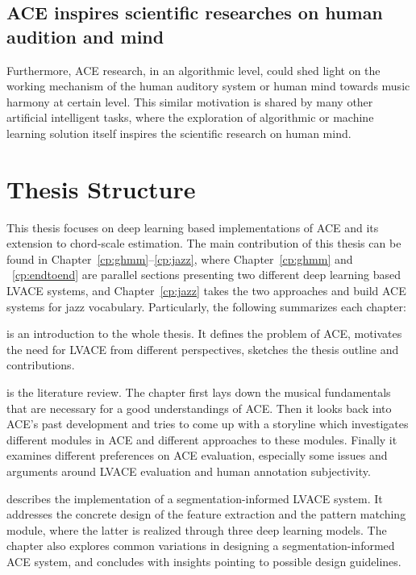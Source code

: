 \subsection{ACE inspires scientific researches on human audition and mind}
Furthermore, ACE research, in an algorithmic level, could shed light on the working mechanism of the human auditory system or human mind towards music harmony at certain level. This similar motivation is shared by many other artificial intelligent tasks\cite{lecun1995convolutional,hinton1995wake}, where the exploration of algorithmic or machine learning solution itself inspires the scientific research on human mind.

\section{Thesis Structure} \label{sec:1-outline}
This thesis focuses on deep learning based implementations of ACE and its extension to chord-scale estimation. The main contribution of this thesis can be found in Chapter~\ref{cp:ghmm}--\ref{cp:jazz}, where Chapter~\ref{cp:ghmm} and ~\ref{cp:endtoend} are parallel sections presenting two different deep learning based LVACE systems, and Chapter~\ref{cp:jazz} takes the two approaches and build ACE systems for jazz vocabulary. Particularly, the following summarizes each chapter:

 is an introduction to the whole thesis. It defines the problem of ACE, motivates the need for LVACE from different perspectives, sketches the thesis outline and contributions.

 is the literature review. The chapter first lays down the musical fundamentals that are necessary for a good understandings of ACE. Then it looks back into ACE's past development and tries to come up with a storyline which investigates different modules in ACE and different approaches to these modules. Finally it examines different preferences on ACE evaluation, especially some issues and arguments around LVACE evaluation and human annotation subjectivity.

 describes the implementation of a segmentation-informed LVACE system. It addresses the concrete design of the feature extraction and the pattern matching module, where the latter is realized through three deep learning models. The chapter also explores common variations in designing a segmentation-informed ACE system, and concludes with insights pointing to possible design guidelines.

